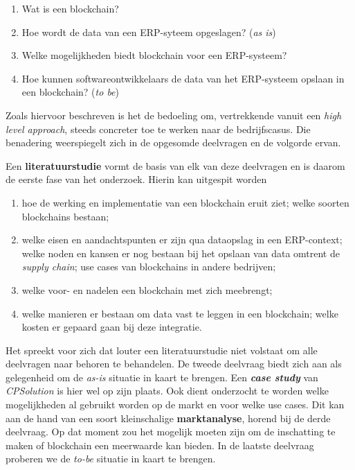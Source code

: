 \begin{enumerate}
	\item Wat is een blockchain?
	\item Hoe wordt de data van een ERP-syteem opgeslagen? (\textit{as is})
	\item Welke mogelijkheden biedt blockchain voor een ERP-systeem?
	\item Hoe kunnen softwareontwikkelaars de data van het ERP-systeem opslaan in een blockchain? (\textit{to be})
	
\end{enumerate}

Zoals hiervoor beschreven is het de bedoeling om, vertrekkende vanuit een \textit{high level approach}, steeds concreter toe te werken naar de bedrijfscasus. Die benadering weerspiegelt zich in de opgesomde deelvragen en de volgorde ervan.

Een \textbf{literatuurstudie} vormt de basis van elk van deze deelvragen en is daarom de eerste fase van het onderzoek. Hierin kan uitgespit worden
\begin{enumerate}
	\item hoe de werking en implementatie van een blockchain eruit ziet; welke soorten blockchains bestaan;
	\item welke eisen en aandachtspunten er zijn qua dataopslag in een ERP-context; welke noden en kansen er nog bestaan bij het opslaan van data omtrent de \textit{supply chain}; use cases van blockchains in andere bedrijven;
	\item welke voor- en nadelen een blockchain met zich meebrengt; 
	\item welke manieren er bestaan om data vast te leggen in een blockchain; welke kosten er gepaard gaan bij deze integratie.
\end{enumerate}

Het spreekt voor zich dat louter een literatuurstudie niet volstaat om alle deelvragen naar behoren te behandelen. 
De tweede deelvraag biedt zich aan als gelegenheid om de \textit{as-is} situatie in kaart te brengen. Een \textbf{\textit{case study}} van \textit{CPSolution} is hier wel op zijn plaats. Ook dient onderzocht te worden welke mogelijkheden al gebruikt worden op de markt en voor welke use cases. Dit kan aan de hand van een soort kleinschalige \textbf{marktanalyse}, horend bij de derde deelvraag. Op dat moment zou het mogelijk moeten zijn om de inschatting te maken of blockchain een meerwaarde kan bieden. In de laatste deelvraag proberen we de \textit{to-be} situatie in kaart te brengen.


